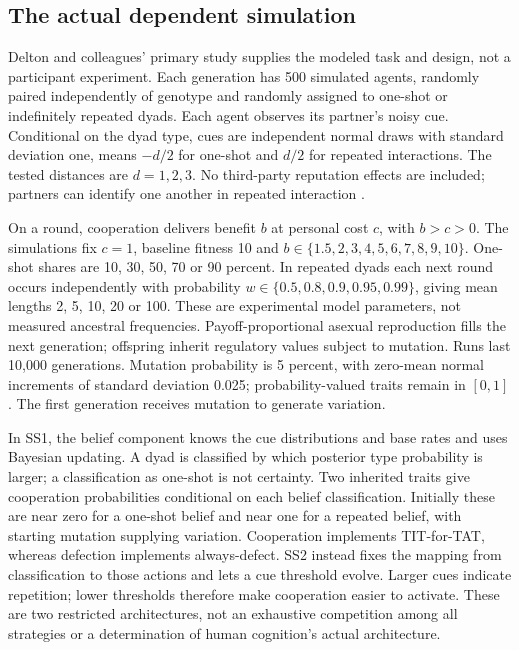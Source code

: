 \subsection{The actual dependent simulation}

Delton and colleagues' primary study supplies the modeled task and
design, not a participant experiment. Each generation has 500 simulated
agents, randomly paired independently of genotype and randomly assigned
to one-shot or indefinitely repeated dyads. Each agent observes its
partner's noisy cue. Conditional on the dyad type, cues are independent
normal draws with standard deviation one, means \(-d/2\) for one-shot
and \(d/2\) for repeated interactions. The tested distances are
\(d=1,2,3\). No third-party reputation effects are included; partners
can identify one another in repeated interaction
\cite[pp.~13336--13337; SI~pp.~1--2]{DeltonEtAl2011Reciprocity}.

On a round, cooperation delivers benefit \(b\) at personal cost \(c\),
with \(b>c>0\). The simulations fix \(c=1\), baseline fitness 10
and \(b\in\{1.5,2,3,4,5,6,7,8,9,10\}\). One-shot shares are
10, 30, 50, 70 or 90 percent. In repeated dyads each next round occurs
independently with probability \(w\in\{0.5,0.8,0.9,0.95,0.99\}\),
giving mean lengths 2, 5, 10, 20 or 100. These are experimental model
parameters, not measured ancestral frequencies. Payoff-proportional
asexual reproduction fills the next generation; offspring inherit
regulatory values subject to mutation. Runs last 10,000 generations.
Mutation probability is 5 percent, with zero-mean normal increments
of standard deviation 0.025; probability-valued traits remain in
\([0,1]\). The first generation receives mutation to generate variation.

In SS1, the belief component knows the cue distributions and base rates
and uses Bayesian updating. A dyad is classified by which posterior
type probability is larger; a classification as one-shot is not certainty.
Two inherited traits give cooperation probabilities conditional on
each belief classification. Initially these are near zero for a
one-shot belief and near one for a repeated belief, with starting
mutation supplying variation. Cooperation implements TIT-for-TAT,
whereas defection implements always-defect. SS2 instead fixes the
mapping from classification to those actions and lets a cue threshold
evolve. Larger cues indicate repetition; lower thresholds therefore
make cooperation easier to activate. These are two restricted
architectures, not an exhaustive competition among all strategies or
a determination of human cognition's actual architecture.

